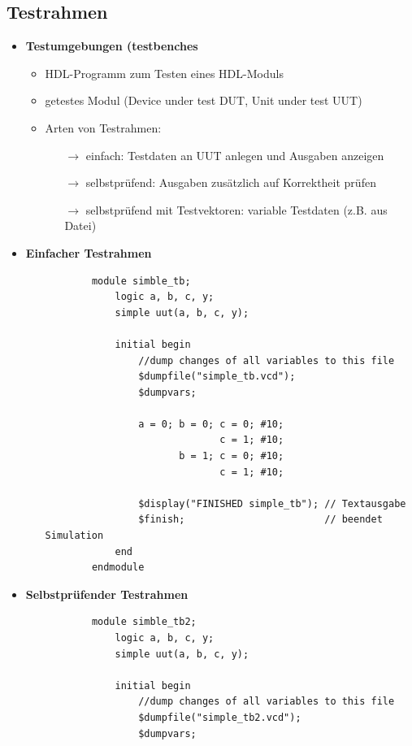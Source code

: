 \documentclass[11pt,a4paper]{article}
\begin{document}
\subsection{Testrahmen}
\begin{itemize}

\item \textbf{Testumgebungen (testbenches}
	\begin{itemize}
	\item HDL-Programm zum Testen eines HDL-Moduls
	\item getestes Modul (Device under test DUT, Unit under test UUT)
	\item Arten von Testrahmen:
		\begin{itemize}
		\item[$\rightarrow$] einfach: Testdaten an UUT anlegen und Ausgaben anzeigen
		\item[$\rightarrow$] selbstprüfend: Ausgaben zusätzlich auf Korrektheit prüfen
		\item[$\rightarrow$] selbstprüfend mit Testvektoren: variable Testdaten (z.B. aus Datei)
		\end{itemize}
	\end{itemize}
	
\item \textbf{Einfacher Testrahmen}
	\begin{itemize}
	\item[]
		\begin{lstlisting}
		module simble_tb;
			logic a, b, c, y;
			simple uut(a, b, c, y);
			
			initial begin
				//dump changes of all variables to this file
				$dumpfile("simple_tb.vcd");
				$dumpvars;
				
				a = 0; b = 0; c = 0; #10;
							  c = 1; #10;
					   b = 1; c = 0; #10;
					   	      c = 1; #10;
					   	      
				$display("FINISHED simple_tb"); // Textausgabe
				$finish; 						// beendet Simulation
			end
		endmodule
		\end{lstlisting}
	\end{itemize}
	
\item \textbf{Selbstprüfender Testrahmen}
	\begin{itemize}
	\item[]
		\begin{lstlisting}
		module simble_tb2;
			logic a, b, c, y;
			simple uut(a, b, c, y);
			
			initial begin
				//dump changes of all variables to this file
				$dumpfile("simple_tb2.vcd");
				$dumpvars;
				

\end{lstlisting}
\end{itemize}
\end{itemize}
\end{document}
